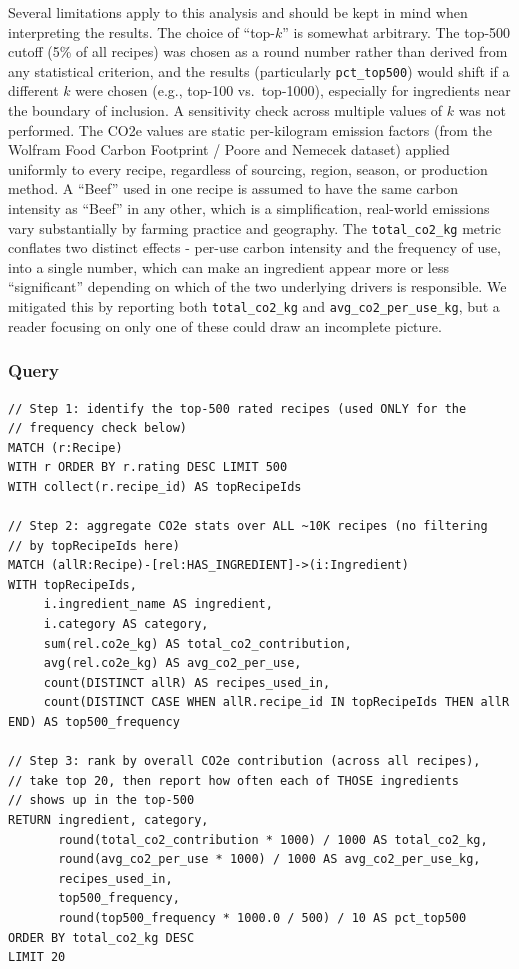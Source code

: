 \documentclass{article}
\begin{document}
Several limitations apply to this analysis and should be kept in mind
when interpreting the results. The choice of ``top-$k$'' is somewhat arbitrary. The top-500 cutoff
(5\% of all recipes) was chosen as a round number rather than derived
from any statistical criterion, and the results (particularly
\texttt{pct\_top500}) would shift if a different $k$ were chosen
(e.g., top-100 vs.\ top-1000), especially for ingredients near the
boundary of inclusion. A sensitivity check across multiple values of
$k$ was not performed. The CO2e values are static per-kilogram emission factors (from the
Wolfram Food Carbon Footprint / Poore and Nemecek dataset) applied
uniformly to every recipe, regardless of sourcing, region, season, or
production method. A ``Beef'' used in one recipe is assumed to have
the same carbon intensity as ``Beef'' in any other, which is a
simplification,  real-world emissions vary substantially by farming
practice and geography. The \texttt{total\_co2\_kg} metric conflates two distinct effects - 
per-use carbon intensity and the frequency of use, into a single
number, which can make an ingredient appear more or less
``significant'' depending on which of the two underlying drivers is
responsible. We mitigated this by reporting both
\texttt{total\_co2\_kg} and \texttt{avg\_co2\_per\_use\_kg}, but a
reader focusing on only one of these could draw an incomplete
picture.

\subsubsection*{Query}

\begin{lstlisting}[style=cypherstyle]
// Step 1: identify the top-500 rated recipes (used ONLY for the
// frequency check below)
MATCH (r:Recipe)
WITH r ORDER BY r.rating DESC LIMIT 500
WITH collect(r.recipe_id) AS topRecipeIds

// Step 2: aggregate CO2e stats over ALL ~10K recipes (no filtering
// by topRecipeIds here)
MATCH (allR:Recipe)-[rel:HAS_INGREDIENT]->(i:Ingredient)
WITH topRecipeIds,
     i.ingredient_name AS ingredient,
     i.category AS category,
     sum(rel.co2e_kg) AS total_co2_contribution,
     avg(rel.co2e_kg) AS avg_co2_per_use,
     count(DISTINCT allR) AS recipes_used_in,
     count(DISTINCT CASE WHEN allR.recipe_id IN topRecipeIds THEN allR END) AS top500_frequency

// Step 3: rank by overall CO2e contribution (across all recipes),
// take top 20, then report how often each of THOSE ingredients
// shows up in the top-500
RETURN ingredient, category,
       round(total_co2_contribution * 1000) / 1000 AS total_co2_kg,
       round(avg_co2_per_use * 1000) / 1000 AS avg_co2_per_use_kg,
       recipes_used_in,
       top500_frequency,
       round(top500_frequency * 1000.0 / 500) / 10 AS pct_top500
ORDER BY total_co2_kg DESC
LIMIT 20
\end{lstlisting}
\end{document}
